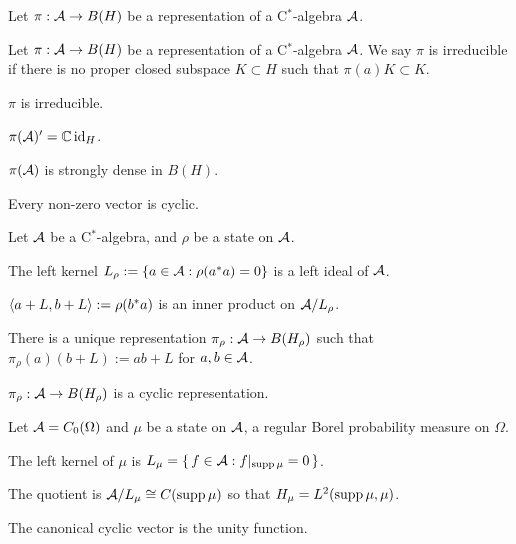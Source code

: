 \documentclass{../note}
\begin{document}
\begin{prb}
Let $\pi:\mathcal{A}\to B(H)$ be a representation of a C$^*$-algebra $\mathcal{A}$.
\begin{parts}
\item
\end{parts}
\end{prb}

\begin{prb}
Let $\pi:\mathcal{A}\to B(H)$ be a representation of a C$^*$-algebra $\mathcal{A}$.
We say $\pi$ is irreducible if there is no proper closed subspace $K\subset H$ such that $\pi(a)K\subset K$.
\begin{parts}
\item $\pi$ is irreducible.
\item $\pi(\mathcal{A})'=\mathbb{C}\operatorname{id}_H$.
\item $\pi(\mathcal{A})$ is strongly dense in $B(H)$.
\item Every non-zero vector is cyclic.
\end{parts}
\end{prb}

\begin{prb}
Let $\mathcal{A}$ be a C$^*$-algebra, and $\rho$ be a state on $\mathcal{A}$.
\begin{parts}
\item The left kernel $L_\rho:=\{a\in\mathcal{A}:\rho(a^*a)=0\}$ is a left ideal of $\mathcal{A}$.
\item $\langle a+L,b+L\rangle:=\rho(b^*a)$ is an inner product on $\mathcal{A}/L_\rho$.
\item There is a unique representation $\pi_\rho:\mathcal{A}\to B(H_\rho)$ such that $\pi_\rho(a)(b+L):=ab+L$ for $a,b\in\mathcal{A}$.
\item $\pi_\rho:\mathcal{A}\to B(H_\rho)$ is a cyclic representation.
\end{parts}
\end{prb}

\begin{prb}
Let $\mathcal{A}=C_0(\Omega)$ and $\mu$ be a state on $\mathcal{A}$, a regular Borel probability measure on $\Omega$.
\begin{parts}
\item The left kernel of $\mu$ is $L_\mu=\{\,f\in\mathcal{A}:f|_{\operatorname{supp}\mu}=0\,\}$.
\item The quotient is $\mathcal{A}/L_\mu\cong C(\operatorname{supp}\mu)$ so that $H_\mu=L^2(\operatorname{supp}\mu,\mu)$.
\item The canonical cyclic vector is the unity function.
\end{parts}
\end{prb}
\end{document}
